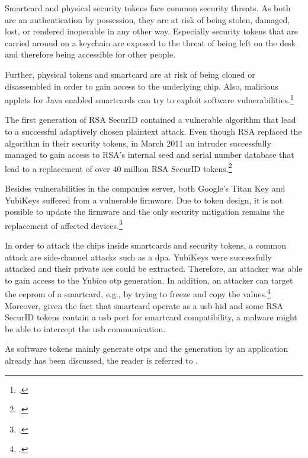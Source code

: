 Smartcard and physical security tokens face common security threats. As both are an authentication by possession, they are at risk of being stolen, damaged, lost, or rendered inoperable in any other way. Especially security tokens that are carried around on a keychain are exposed to the threat of being left on the desk and therefore being accessible for other people.

Further, physical tokens and smartcard are at risk of being cloned or disassembled in order to gain access to the underlying chip. Also, malicious applets for Java enabled smartcards can try to exploit software vulnerabilities.\footcites[See][14--16]{witteman2002advances}

The first generation of RSA SecurID contained a vulnerable algorithm that lead to a successful adaptively chosen plaintext attack. Even though RSA replaced the algorithm in their security tokens, in March 2011 an intruder successfully managed to gain access to RSA's internal seed and serial number database that lead to a replacement of over 40 million RSA SecurID tokens.\footcites[See][480]{eckert-it-sec-9}[See][369]{BIRYUKOV2005364}[See][8]{1324198}

Besides vulnerabilities in the companies server, both Google's Titan Key and YubiKeys suffered from a vulnerable firmware. Due to token design, it is not possible to update the firmware and the only security mitigation remains the replacement of affected devices.\footcites[See][]{yubikey-heise}[See][]{titan-key}

In order to attack the chips inside smartcards and security tokens, a common attack are side-channel attacks such as a \gls{dpa}. YubiKeys were successfully attacked and their private \gls{aes} could be extracted. Therefore, an attacker was able to gain access to the Yubico \gls{otp} generation. In addition, an attacker can target the \gls{eeprom} of a smartcard, e.g., by trying to freeze and copy the values.\footcites[See][210, 212, 219]{10.1007/978-3-642-41284-4_11}[See][502--503, 509]{anderson2008security}\\
Moreover, given the fact that smartcard operate as a \gls{usb}-\gls{hid} and some RSA SecurID tokens contain a \gls{usb} port for smartcard compatibility, a malware might be able to intercept the \gls{usb} communication.

As software tokens mainly generate \glspl{otp} and the generation by an application already has been discussed, the reader is referred to .
 